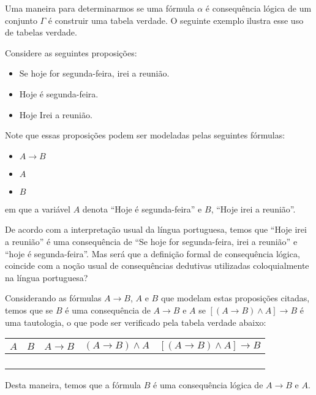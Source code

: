 Uma maneira para determinarmos se uma f\'ormula $\alpha$ \'e
consequ\^encia l\'ogica de um conjunto $\Gamma$ \'e construir uma
tabela verdade. O seguinte exemplo ilustra esse uso de tabelas
verdade.
\begin{Example}
Considere as seguintes proposi\c{c}\~oes:
\begin{itemize}
  \item Se hoje for segunda-feira, irei a reuni\~ao.
  \item Hoje \'e segunda-feira.
   \item Hoje Irei a reuni\~ao.
\end{itemize}
Note que essas proposi\c{c}\~oes podem ser modeladas pelas seguintes
f\'ormulas:
\begin{itemize}
  \item $A \to B$
  \item $A$
  \item $B$
\end{itemize}
em que a vari\'avel $A$ denota ``Hoje \'e segunda-feira'' e $B$,
``Hoje irei a reuni\~ao''.

De acordo com a interpreta\c{c}\~ao usual da l\'ingua portuguesa,
temos que ``Hoje irei a reuni\~ao'' \'e uma consequ\^encia de ``Se
hoje for segunda-feira, irei a reuni\~ao'' e ``hoje \'e
segunda-feira''. Mas ser\'a que a defini\c{c}\~ao formal de
consequ\^encia l\'ogica, coincide com a no\c{c}\~ao usual de
consequ\^encias dedutivas utilizadas coloquialmente na l\'ingua
portuguesa?

Considerando as f\'ormulas $A\to B$, $A$ e $B$ que
modelam estas proposi\c{c}\~oes citadas, temos que se  $B$ \'e uma
consequ\^encia de $A \to B$ e $A$ se $[(A\to B)\land A]\to B$ \'e uma
tautologia, o que pode ser verificado pela tabela verdade abaixo:
\begin{table}[h]
\begin{tabular}{|c|c|c|c|c|}
\hline
$A$ & $B$ & $A\to B$ & $(A\to B)\land A$ & $[(A\to B)\land A]\to B$\\
\hline
\F   & \F    &     \T       &      \F                     & \T \\
\F   & \T    &     \T       &     \F                      & \T \\
\T   & \F    &     \F       &     \F                      & \T \\
\T   & \T   &     \T        &    \T                       & \T \\ \hline
\end{tabular}
\centering
\end{table}

Desta maneira, temos que a f\'ormula $B$ \'e uma consequ\^encia
l\'ogica de $A \to B$ e $A$.
\end{Example}

